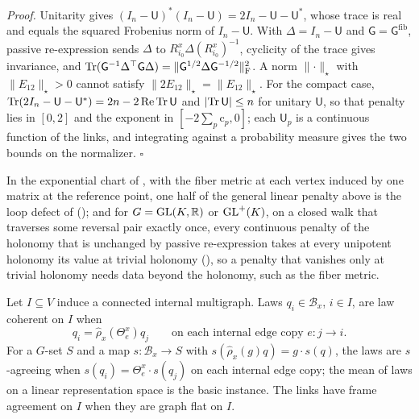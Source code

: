 \noindent\emph{Proof.}
Unitarity gives $(I_n-\mathsf U)^*(I_n-\mathsf U)=2I_n-\mathsf U-\mathsf U^*$, whose trace is real and
equals the squared Frobenius norm of $I_n-\mathsf U$. With $\Delta=I_n-\mathsf U$ and
$\mathsf G=\mathsf G^{\mathrm{fib}}$, passive re-expression sends $\Delta$ to
$R_{i_0}^x\Delta(R_{i_0}^x)^{-1}$, cyclicity of the trace gives invariance, and
$\operatorname{Tr}(\mathsf G^{-1}\Delta^\top\mathsf G\Delta)=\lVert\mathsf G^{1/2}\Delta\mathsf G^{-1/2}\rVert_{\mathrm F}^2$.
A norm $\lVert\cdot\rVert_\star$ with $\lVert E_{12}\rVert_\star>0$ cannot satisfy
$\lVert2E_{12}\rVert_\star=\lVert E_{12}\rVert_\star$. For the compact case,
$\operatorname{Tr}(2I_n-\mathsf U-\mathsf U^*)=2n-2\operatorname{Re}\operatorname{Tr}\mathsf U$ and $\lvert\operatorname{Tr}\mathsf U\rvert\leq n$
for unitary $\mathsf U$, so that penalty lies in $[0,2]$ and the exponent in $[-2\sum_p\mathrm c_p,0]$;
each $\mathsf U_p$ is a continuous function of the links, and integrating against a probability
measure gives the two bounds on the normalizer. \hfill$\square$

In the exponential chart of , with the fiber metric at each vertex induced by one matrix at
the reference point, one half of the general linear penalty above is the loop defect of
 (); and for $G=\mathrm{GL}(K,\mathbb R)$ or $\mathrm{GL}^+(K)$, on a
closed walk that traverses some reversal pair exactly once, every continuous penalty of the holonomy that
is unchanged by passive re-expression takes at every unipotent holonomy its value at trivial holonomy
(), so a penalty that vanishes only at trivial holonomy needs data
beyond the holonomy, such as the fiber metric.

Let $I\subseteq V$ induce a connected internal multigraph. Laws $q_i\in\mathcal B_x$, $i\in I$, are law
coherent on $I$ when
\begin{equation}
q_i=\widehat\rho_x(\Theta_e^x)q_j
\qquad\text{on each internal edge copy }e:j\to i.
\label{eq:phil-law-coherence}
\end{equation}
For a $G$-set $S$ and a map $s:\mathcal B_x\to S$ with $s(\widehat\rho_x(g)q)=g\cdot s(q)$, the laws are
$s$-agreeing when $s(q_i)=\Theta_e^x\cdot s(q_j)$ on each internal edge copy; the mean of laws on a
linear representation space is the basic instance. The links have frame agreement on $I$ when they
are graph flat on $I$.

